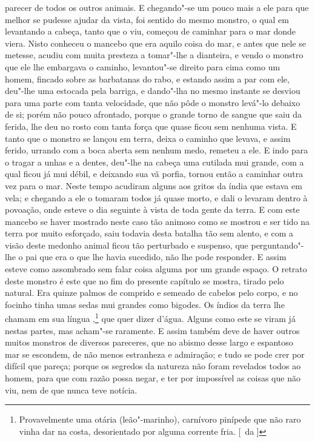parecer de todos os outros animais. E chegando"-se um pouco mais a ele
para que melhor se pudesse ajudar da vista, foi sentido do mesmo
monstro, o qual em levantando a cabeça, tanto que o viu, começou de
caminhar para o mar donde viera. Nisto conheceu o mancebo que
era aquilo coisa do mar, e antes que nele se metesse, acudiu com muita
presteza a tomar"-lhe a dianteira, e vendo o monstro que ele lhe embargava 
o caminho, levantou"-se direito para cima como um homem, fincado sobre as 
barbatanas do rabo, e estando assim a par com ele, deu"-lhe uma estocada pela 
barriga, e dando"-lha no mesmo instante se desviou para uma parte com tanta velocidade,
que não pôde o monstro levá"-lo debaixo de si; porém não pouco afrontado, porque o grande torno
de sangue que saiu da ferida, lhe deu no rosto com tanta força que
quase ficou sem nenhuma vista. E tanto que o monstro se lançou em terra,
deixa o caminho que levava, e assim ferido, urrando com a boca aberta sem
nenhum medo, remeteu a ele. E indo para o tragar a unhas e a dentes,
deu"-lhe na cabeça uma cutilada mui grande, com a qual ficou já mui
débil, e deixando sua vã porfia, tornou então a caminhar outra vez para
o mar. Neste tempo acudiram alguns  aos gritos da índia que
estava em vela; e chegando a ele o tomaram todos já quase morto, e dali
o levaram dentro à povoação, onde esteve o dia seguinte à vista de toda
gente da terra. E com este mancebo se haver mostrado neste caso tão
animoso como se mostrou e ser tido na terra por muito esforçado, saiu
todavia desta batalha tão sem alento, e com a visão deste medonho
animal ficou tão perturbado e suspenso, que perguntando"-lhe o pai que
era o que lhe havia sucedido, não lhe pode responder. E assim esteve
como assombrado sem falar coisa alguma por um grande espaço. O retrato
deste monstro é este que no fim do presente capítulo se mostra, tirado
pelo natural. Era quinze palmos de comprido e semeado de cabelos pelo
corpo, e no focinho tinha umas sedas mui grandes como bigodes. Os índios
da terra lhe chamam em sua língua ,\footnote{ Provavelmente uma otária 
(leão"-marinho), carnívoro pinípede que não raro vinha dar na costa, 
desorientado por alguma corrente fria. [~da ]} que quer dizer 
d'água. Alguns como este se viram já nestas partes, mas acham"-se
raramente. E assim também deve de haver outros muitos monstros de
diversos pareceres, que no abismo desse largo e espantoso mar se
escondem, de não menos estranheza e admiração; e tudo se pode crer por
difícil que pareça; porque os segredos da natureza não foram revelados
todos ao homem, para que com razão possa negar, e ter por impossível as
coisas que não viu, nem de que nunca teve notícia.					%

